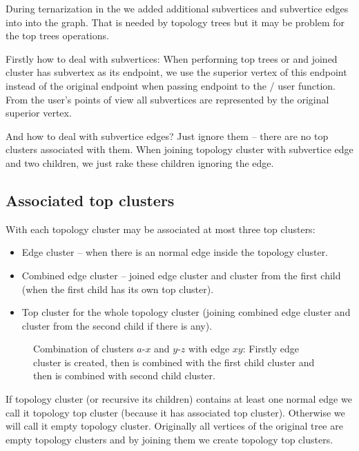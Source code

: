 During ternarization in the  we added additional
subvertices and subvertice edges into into the graph. That is needed by topology
trees but it may be problem for the top trees operations.

Firstly how to deal with subvertices: When performing top trees \Join{} or
\Split{} and joined cluster has subvertex as its endpoint, we use the superior
vertex of this endpoint instead of the original endpoint when passing endpoint
to the \Join/\Split{} user function. From the user's points of view all
subvertices are represented by the original superior vertex.

And how to deal with subvertice edges? Just ignore them -- there are no top
clusters associated with them. When joining topology cluster with subvertice
edge and two children, we just rake these children ignoring the edge.

\subsection{Associated top clusters}

With each topology cluster may be associated at most three top clusters:

\begin{itemize}
\item {\I Edge cluster} -- when there is an normal edge inside the topology cluster.
\item {\I Combined edge cluster} -- joined {\I edge cluster} and cluster from
the first child (when the first child has its own top cluster).
\item {\I Top cluster} for the whole topology cluster (joining {\I combined edge
cluster} and cluster from the second child if there is any).
\end{itemize}

\begin{figure}[H]
\centering
{}
\caption{Combination of clusters $a$-$x$ and $y$-$z$ with edge $xy$: Firstly
edge cluster is created, then is combined with the first child cluster and
then is combined with second child cluster.}
\end{figure}


If topology cluster (or recursive its children) contains at least one normal
edge we call it {\I topology top cluster} (because it has associated top
cluster). Otherwise we will call it {\I empty topology cluster}. Originally all
vertices of the original tree are empty topology clusters and by joining them we
create topology top clusters.


